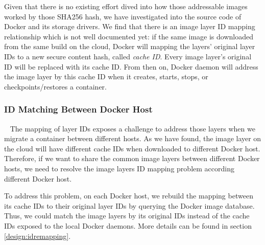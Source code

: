 %
%
Given that there is no existing effort dived into how those addressable images worked by those SHA256 hash, we have investigated into the source code of Docker and its storage drivers.
We find that there is an image layer ID mapping relationship which is not well documented yet: if the same image is downloaded from the same build on the cloud, Docker will mapping the layers' original layer IDs to a new secure content hash, called \textit{cache ID}. Every image layer's original ID will be replaced with its cache ID. From then on, Docker daemon will address the image layer by this cache ID when it creates, starts, stops, or checkpoints/restores a container. 

\smallbreak
\subsubsection{ID Matching Between Docker Host} \label{intro:idMatching}
~\smallbreak
The mapping of layer IDs exposes a challenge to address those layers when we migrate a container between different hosts. 
As we have found, the image layer on the cloud will have different cache IDs when downloaded to different Docker host. 
Therefore, if we want to share the common image layers between different Docker hosts, we need to resolve the image layers ID mapping problem according different Docker host. 

To address this problem, on each Docker host, we rebuild the mapping between its cache IDs to their original layer IDs by querying the Docker image database. 
Thus, we could match the image layers by its original IDs instead of the cache IDs exposed to the local Docker daemons. More details can be found in section \ref{design:idremapping}.



